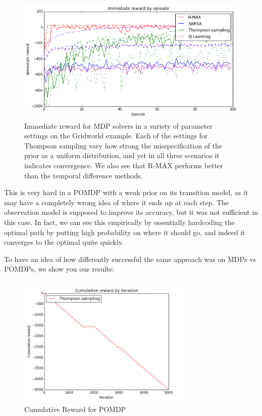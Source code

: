 \documentclass{pset}
\begin{document}
\begin{figure}[ht]
\begin{center}
\centerline{\includegraphics[width=\textwidth]{img/mdp_imm_rewards.png}}
\caption{Immediate reward for MDP solvers in a variety of parameter settings on
the Gridworld example.
Each of the settings for Thompson sampling vary how strong the misspecification of the
prior as a uniform distribution, and yet in all three scenarios it indicates
convergence. We also see that R-MAX performs better than the temporal difference methods.}
\end{center}
\end{figure}

This is very hard in a POMDP with a weak prior on its transition model, as it
may have a completely wrong idea of where it ends up at each step. The
observation model is supposed to improve its accuracy, but it was not sufficient
in this case. In fact, we can see this empirically by essentially hardcoding the
optimal path by putting high probability on where it should go, and indeed it
converges to the optimal quite quickly.

To have an idea of how differently successful the same approach was on MDPs vs
POMDPs, we show you our results:

\begin{figure}[ht]
\centering
\includegraphics[width=0.75\textwidth]{img/pomdp.png}
\caption{\label{fig:pomdp}Cumulative Reward for POMDP}
\end{figure}
\end{document}
